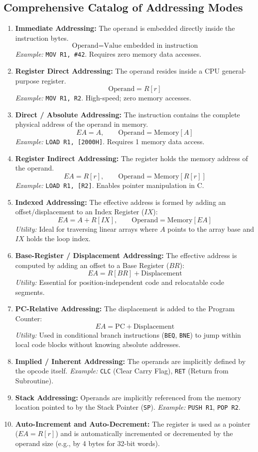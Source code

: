 \subsection{Comprehensive Catalog of Addressing Modes}
\begin{enumerate}[label=\bfseries\arabic*.]
    \item \textbf{Immediate Addressing:} The operand is embedded directly inside the instruction bytes.
    \[ \text{Operand} = \text{Value embedded in instruction} \]
    \textit{Example:} \texttt{MOV R1, \#42}. Requires zero memory data accesses.
    \item \textbf{Register Direct Addressing:} The operand resides inside a CPU general-purpose register.
    \[ \text{Operand} = R[r] \]
    \textit{Example:} \texttt{MOV R1, R2}. High-speed; zero memory accesses.
    \item \textbf{Direct / Absolute Addressing:} The instruction contains the complete physical address of the operand in memory.
    \[ EA = A, \qquad \text{Operand} = \text{Memory}[A] \]
    \textit{Example:} \texttt{LOAD R1, [2000H]}. Requires 1 memory data access.
    \item \textbf{Register Indirect Addressing:} The register holds the memory address of the operand.
    \[ EA = R[r], \qquad \text{Operand} = \text{Memory}[R[r]] \]
    \textit{Example:} \texttt{LOAD R1, [R2]}. Enables pointer manipulation in C.
    \item \textbf{Indexed Addressing:} The effective address is formed by adding an offset/displacement to an Index Register ($IX$):
    \[ EA = A + R[IX], \qquad \text{Operand} = \text{Memory}[EA] \]
    \textit{Utility:} Ideal for traversing linear arrays where $A$ points to the array base and $IX$ holds the loop index.
    \item \textbf{Base-Register / Displacement Addressing:} The effective address is computed by adding an offset to a Base Register ($BR$):
    \[ EA = R[BR] + \text{Displacement} \]
    \textit{Utility:} Essential for position-independent code and relocatable code segments.
    \item \textbf{PC-Relative Addressing:} The displacement is added to the Program Counter:
    \[ EA = \text{PC} + \text{Displacement} \]
    \textit{Utility:} Used in conditional branch instructions (\texttt{BEQ}, \texttt{BNE}) to jump within local code blocks without knowing absolute addresses.
    \item \textbf{Implied / Inherent Addressing:} The operands are implicitly defined by the opcode itself.
    \textit{Example:} \texttt{CLC} (Clear Carry Flag), \texttt{RET} (Return from Subroutine).
    \item \textbf{Stack Addressing:} Operands are implicitly referenced from the memory location pointed to by the Stack Pointer (\texttt{SP}).
    \textit{Example:} \texttt{PUSH R1}, \texttt{POP R2}.
    \item \textbf{Auto-Increment and Auto-Decrement:} The register is used as a pointer ($EA = R[r]$) and is automatically incremented or decremented by the operand size (e.g., by 4 bytes for 32-bit words).
\end{enumerate}

